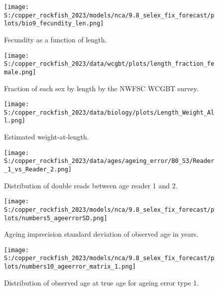 \documentclass[11pt,
  english,
  letterpaper,
]{article}
\begin{document}
\begin{figure}
\centering
\texttt{[image: S:/copper\_rockfish\_2023/models/nca/9.8\_selex\_fix\_forecast/plots/bio9\_fecundity\_len.png]}
\caption{Fecundity as a function of length.\label{fig:fecundity}}
\end{figure}

\pagebreak

\begin{figure}
\centering
\texttt{[image: S:/copper\_rockfish\_2023/data/wcgbt/plots/length\_fraction\_female.png]}
\caption{Fraction of each sex by length by the NWFSC WCGBT survey.\label{fig:frac-sex-len}}
\end{figure}

\pagebreak

\begin{figure}
\centering
\texttt{[image: S:/copper\_rockfish\_2023/data/biology/plots/Length\_Weight\_All.png]}
\caption{Estimated weight-at-length.\label{fig:est-len-wght}}
\end{figure}

\pagebreak

\begin{figure}
\centering
\texttt{[image: S:/copper\_rockfish\_2023/data/ages/ageing\_error/B0\_S3/Reader\_1\_vs\_Reader\_2.png]}
\caption{Distribution of double reads between age reader 1 and 2.\label{fig:age-error-dist}}
\end{figure}

\pagebreak

\begin{figure}
\centering
\texttt{[image: S:/copper\_rockfish\_2023/models/nca/9.8\_selex\_fix\_forecast/plots/numbers5\_ageerrorSD.png]}
\caption{Ageing imprecision standard deviation of observed age in years.\label{fig:age-error}}
\end{figure}

\pagebreak

\begin{figure}
\centering
\texttt{[image: S:/copper\_rockfish\_2023/models/nca/9.8\_selex\_fix\_forecast/plots/numbers10\_ageerror\_matrix\_1.png]}
\caption{Distribution of observed age at true age for ageing error type 1.\label{fig:age-error-matrix}}
\end{figure}

\pagebreak
\end{document}
